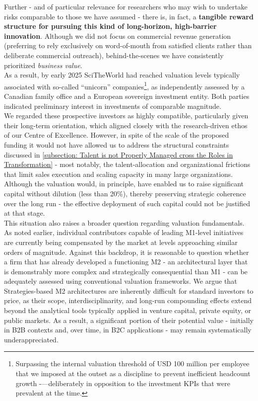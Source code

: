 \documentclass{article}
\begin{document}
Further - and of particular relevance for researchers who may wish to undertake risks comparable to those we have assumed - there is, in fact, a \textbf{tangible reward structure for pursuing this kind of long-horizon, high-barrier innovation}. Although we did not focus on commercial revenue generation (preferring to rely exclusively on word-of-mouth from satisfied clients rather than deliberate commercial outreach), behind-the-scenes we have consistently prioritized \textit{business value}.\\

As a result, by early 2025 SciTheWorld had reached valuation levels typically associated with so-called “unicorn” companies\footnote{Surpassing the internal valuation threshold of USD 100 million per employee that we imposed at the outset as a discipline to prevent inefficient headcount growth -—deliberately in opposition to the investment KPIs that were prevalent at the time.}, as independently assessed by a Canadian family office and a European sovereign investment entity. Both parties indicated preliminary interest in investments of comparable magnitude.\\

We regarded these prospective investors as highly compatible, particularly given their long-term orientation, which aligned closely with the research-driven ethos of our Centre of Excellence. However, in spite of the scale of the proposed funding it would not have allowed us to address the structural constraints discussed in \ref{subsection: Talent is not Properly Managed cross the Roles in Transformation} - most notably, the talent-allocation and organizational frictions that limit sales execution and scaling capacity in many large organizations. Although the valuation would, in principle, have enabled us to raise significant capital without dilution (less than 20\%), thereby preserving strategic coherence over the long run - the effective deployment of such capital could not be justified at that stage.\\

This situation also raises a broader question regarding valuation fundamentals. As noted earlier, individual contributors capable of leading M1-level initiatives are currently being compensated by the market at levels approaching similar orders of magnitude. Against this backdrop, it is reasonable to question whether a firm that has already developed a functioning M2 - an architectural layer that is demonstrably more complex and strategically consequential than M1 - can be adequately assessed using conventional valuation frameworks. We argue that Strategies-based M2 architectures are inherently difficult for standard investors to price, as their scope, interdisciplinarity, and long-run compounding effects extend beyond the analytical tools typically applied in venture capital, private equity, or public markets. As a result, a significant portion of their potential value - initially in B2B contexts and, over time, in B2C applications - may remain systematically underappreciated.\\
\end{document}
